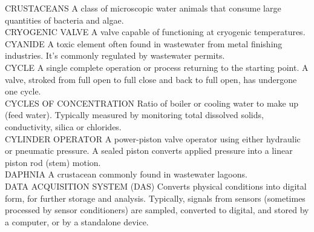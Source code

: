 \documentclass{article}
\begin{document}
CRUSTACEANS
A class of microscopic water animals that consume large quantities of bacteria and algae.
\vspace{0.3cm}\\
CRYOGENIC VALVE
A valve capable of functioning at cryogenic temperatures.
\vspace{0.3cm}\\
CYANIDE
A toxic element often found in wastewater from metal finishing industries. It’s commonly regulated by wastewater permits.
\vspace{0.3cm}\\
CYCLE
A single complete operation or process returning to the starting point. A valve, stroked from full open to full close and back to full open, has undergone one cycle.
\vspace{0.3cm}\\
CYCLES OF CONCENTRATION
Ratio of boiler or cooling water to make up (feed water). Typically measured by monitoring total dissolved solids, conductivity, silica or chlorides.
\vspace{0.3cm}\\
CYLINDER OPERATOR
A power-piston valve operator using either hydraulic or pneumatic pressure. A sealed piston converts applied pressure into a linear piston rod (stem) motion.
\vspace{0.3cm}\\
DAPHNIA
A crustacean commonly found in wastewater lagoons.
\vspace{0.3cm}\\
DATA ACQUISITION SYSTEM (DAS)
Converts physical conditions into digital form, for further storage and analysis. Typically, signals from sensors (sometimes processed by sensor conditioners) are sampled, converted to digital, and stored by a computer, or by a standalone device.
\vspace{0.3cm}\\
\end{document}
